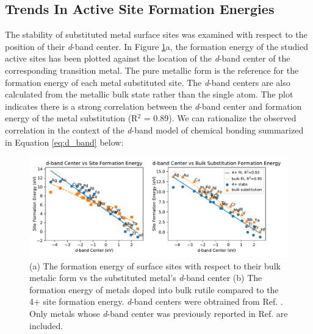 
\subsection{Trends In Active Site Formation Energies}

The stability of substituted metal surface sites was examined with respect to the position of their \textit{d}-band center. In Figure \ref{fig:d_band}a, the formation energy of the studied active sites has been plotted against the location of the \textit{d}-band center of the corresponding transition metal. The pure metallic form is the reference for the formation energy of each metal substituted site. The \textit{d}-band centers are also calculated from the metallic bulk state rather than the single atom. The plot indicates there is a strong correlation between the \textit{d}-band center and formation energy of the metal substitution (R$^2$ = 0.89). We can rationalize the observed correlation in the context of the \textit{d}-band model of chemical bonding \cite{Hammer_1995, Nilsson_2008} summarized in Equation \ref{eq:d_band} below:
\begin{figure}
    \centering
    \includegraphics[width=0.9\linewidth]{Images/d_band_vs_bulk_formation.pdf}
    \caption{(a) The formation energy of surface sites with respect to their bulk metalic form vs the substituted metal's \textit{d}-band center (b) The formation energy of metals doped into bulk rutile compared to the 4+ site formation energy. \textit{d}-band centers were obtrained from Ref. . Only metals whose \textit{d}-band center was previously reported in Ref.  are included.}
    \label{fig:d_band}
\end{figure}

